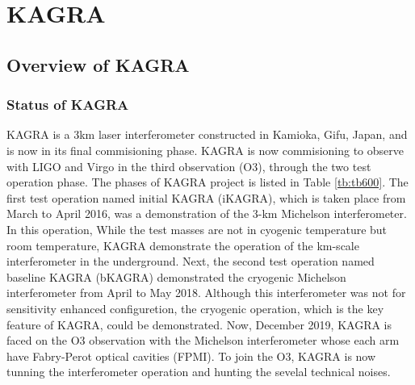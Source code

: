 \chapter{KAGRA}
\section{Overview of KAGRA}
\subsection{Status of KAGRA}
KAGRA is a 3km laser interferometer constructed in Kamioka, Gifu, Japan, and is now in its final commisioning phase. KAGRA is now commisioning to observe with LIGO and Virgo in the third observation (O3), through the two test operation phase. The phases of KAGRA project is listed in Table \ref{tb:tb600}. The first test operation named initial KAGRA (iKAGRA), which is taken place from March to April 2016, was a demonstration of the 3-km Michelson interferometer. In this operation, While the test masses are not in cyogenic temperature but room temperature, KAGRA demonstrate the operation of the km-scale interferometer in the underground. Next, the second test operation named baseline KAGRA (bKAGRA) demonstrated the cryogenic Michelson interferometer from April to May 2018. Although this interferometer was not for sensitivity enhanced configuretion, the cryogenic operation, which is the key feature of KAGRA, could be demonstrated. Now, December 2019, KAGRA is faced on the O3 observation with the Michelson interferometer whose each arm have Fabry-Perot optical cavities (FPMI). To join the O3, KAGRA is now tunning the interferometer operation and hunting the sevelal technical noises.

